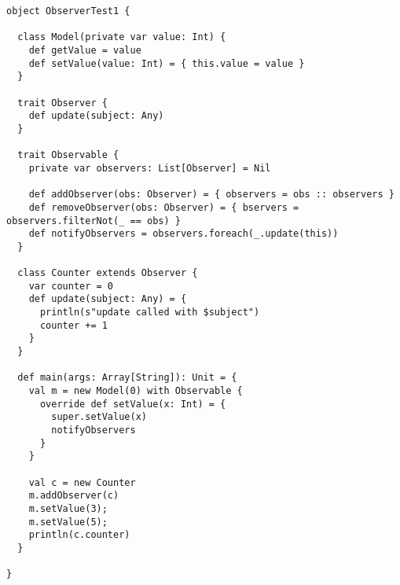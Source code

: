 \begin{lstlisting}
object ObserverTest1 {

  class Model(private var value: Int) {
    def getValue = value
    def setValue(value: Int) = { this.value = value }
  }

  trait Observer {
    def update(subject: Any)
  }

  trait Observable {
    private var observers: List[Observer] = Nil

    def addObserver(obs: Observer) = { observers = obs :: observers }
    def removeObserver(obs: Observer) = { bservers = observers.filterNot(_ == obs) }
    def notifyObservers = observers.foreach(_.update(this))
  }

  class Counter extends Observer {
    var counter = 0
    def update(subject: Any) = {
      println(s"update called with $subject")
      counter += 1
    }
  }

  def main(args: Array[String]): Unit = {
    val m = new Model(0) with Observable {
      override def setValue(x: Int) = {
        super.setValue(x)
        notifyObservers
      }
    }

    val c = new Counter
    m.addObserver(c)
    m.setValue(3);
    m.setValue(5);
    println(c.counter)
  }

}
\end{lstlisting}

\clearpage